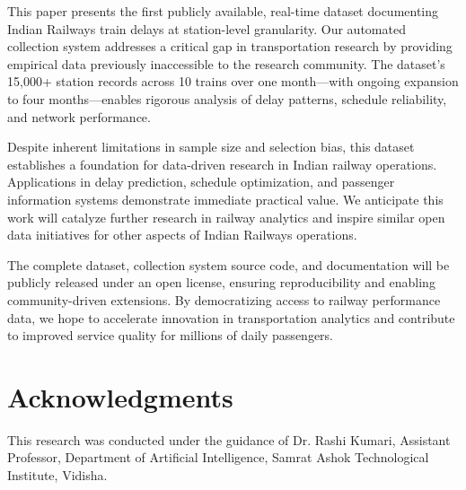 \documentclass[conference]{IEEEtran}
\begin{document}
This paper presents the first publicly available, real-time dataset documenting Indian Railways train delays at station-level granularity. Our automated collection system addresses a critical gap in transportation research by providing empirical data previously inaccessible to the research community. The dataset's 15,000+ station records across 10 trains over one month—with ongoing expansion to four months—enables rigorous analysis of delay patterns, schedule reliability, and network performance.

Despite inherent limitations in sample size and selection bias, this dataset establishes a foundation for data-driven research in Indian railway operations. Applications in delay prediction, schedule optimization, and passenger information systems demonstrate immediate practical value. We anticipate this work will catalyze further research in railway analytics and inspire similar open data initiatives for other aspects of Indian Railways operations.

The complete dataset, collection system source code, and documentation will be publicly released under an open license, ensuring reproducibility and enabling community-driven extensions. By democratizing access to railway performance data, we hope to accelerate innovation in transportation analytics and contribute to improved service quality for millions of daily passengers.

\section*{Acknowledgments}

This research was conducted under the guidance of Dr. Rashi Kumari, Assistant Professor, Department of Artificial Intelligence, Samrat Ashok Technological Institute, Vidisha.
\end{document}
